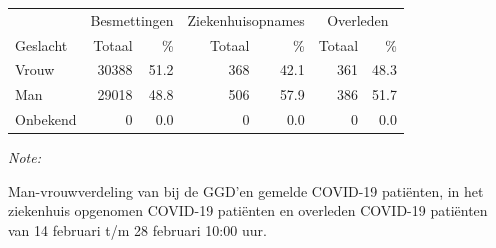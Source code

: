 \documentclass[
  english,
  man,floatsintext]{apa6}
\begin{document}
\begin{table}
\centering\begingroup\fontsize{11}{13}\selectfont

\begin{threeparttable}
\begin{tabular}{lrrrrrr}
\toprule
\multicolumn{1}{c}{ } & \multicolumn{2}{c}{Besmettingen} & \multicolumn{2}{c}{Ziekenhuisopnames} & \multicolumn{2}{c}{Overleden} \\
\cmidrule(l{3pt}r{3pt}){2-3} \cmidrule(l{3pt}r{3pt}){4-5} \cmidrule(l{3pt}r{3pt}){6-7}
Geslacht & Totaal & \% & Totaal & \% & Totaal & \%\\
\midrule
Vrouw & 30388 & 51.2 & 368 & 42.1 & 361 & 48.3\\
Man & 29018 & 48.8 & 506 & 57.9 & 386 & 51.7\\
Onbekend & 0 & 0.0 & 0 & 0.0 & 0 & 0.0\\
\bottomrule
\end{tabular}
\begin{tablenotes}
\item \textit{Note: } 
\item Man-vrouwverdeling van bij de GGD’en gemelde COVID-19 patiënten, in het ziekenhuis opgenomen COVID-19 patiënten en overleden COVID-19 patiënten van 14 februari t/m 28 februari 10:00 uur.
\end{tablenotes}
\end{threeparttable}
\endgroup{}
\end{table}
\newpage
\end{document}
